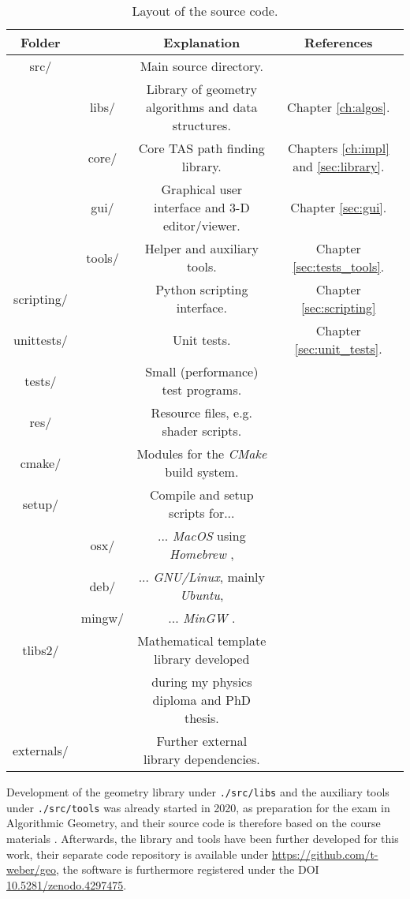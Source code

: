 \begin{table}[htb]
	\centering
	\begin{tabular}{|c c|c|c|}
		\hline
		\bf{Folder} & & \bf{Explanation} & \bf{References} \tabularnewline
		\hline
		src/ & & Main source directory. & \tabularnewline
		       & libs/ & Library of geometry algorithms and data structures. & Chapter \ref{ch:algos}. \tabularnewline
		       & core/ & Core TAS path finding library. & Chapters \ref{ch:impl} and \ref{sec:library}. \tabularnewline
		       & gui/ & Graphical user interface and 3-D editor/viewer. & Chapter \ref{sec:gui}. \tabularnewline
		       & tools/ & Helper and auxiliary tools. & Chapter \ref{sec:tests_tools}. \tabularnewline
		\hline
		scripting/ & & Python scripting interface. & Chapter \ref{sec:scripting} \tabularnewline
		\hline
		unittests/ & & Unit tests. & Chapter \ref{sec:unit_tests}. \tabularnewline
		\hline
		tests/ & & Small (performance) test programs. & \tabularnewline
		\hline
		res/ & & Resource files, e.g. shader scripts. & \tabularnewline
		\hline
		cmake/ & & Modules for the \textit{CMake} \cite{Martin2007, web_cmake} build system. & \tabularnewline
		\hline
		setup/ & & Compile and setup scripts for... & \tabularnewline
		           & osx/ & ... \textit{MacOS} using \textit{Homebrew} \cite{web_homebrew}, & \tabularnewline
		           & deb/ & ... \textit{GNU/Linux}, mainly \textit{Ubuntu}, & \tabularnewline
		           & mingw/ & ... \textit{MinGW} \cite{web_mingw64}. & \tabularnewline
		\hline
		tlibs2/ & & Mathematical template library developed  & \cite{Takin2016, Takin2017, Takin2021, DiplomaWeber, PhDWeber} \tabularnewline
		           & & during my physics diploma and PhD thesis. & \tabularnewline
		\hline
		externals/ & & Further external library dependencies. & \tabularnewline
		\hline
	\end{tabular}
	\caption[Source code layout.]{Layout of the source code.}
	\label{tab:sourcelayout}
\end{table}

Development of the geometry library under \lstinline|./src/libs| and the auxiliary tools under \lstinline|./src/tools| 
was already started in 2020, as preparation for the exam in Algorithmic Geometry, and their source code 
is therefore based on the course materials \cite{FUH_geo2020}. 
Afterwards, the library and tools have been further developed for this work, their separate code repository is available under 
\url{https://github.com/t-weber/geo}, the software is furthermore registered under the DOI 
\href{https://doi.org/10.5281/zenodo.4297475}{10.5281/zenodo.4297475}.

